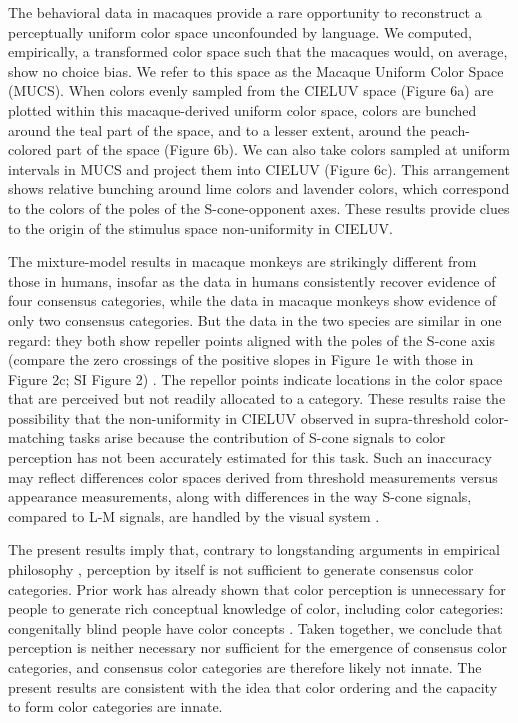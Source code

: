 The behavioral data in macaques provide a rare opportunity to reconstruct a perceptually uniform color space unconfounded by language. We computed, empirically, a transformed color space such that the macaques would, on average, show no choice bias. We refer to this space as the Macaque Uniform Color Space (MUCS). When colors evenly sampled from the CIELUV space (Figure 6a) are plotted within this macaque-derived uniform color space, colors are bunched around the teal part of the space, and to a lesser extent, around the peach-colored part of the space (Figure 6b). We can also take colors sampled at uniform intervals in MUCS and project them into CIELUV (Figure 6c). This arrangement shows relative bunching around lime colors and lavender colors, which correspond to the colors of the poles of the S-cone-opponent axes. These results provide clues to the origin of the stimulus space non-uniformity in CIELUV.

The mixture-model results in macaque monkeys are strikingly different from those in humans, insofar as the data in humans consistently recover evidence of four consensus categories, while the data in macaque monkeys show evidence of only two consensus categories. But the data in the two species are similar in one regard: they both show repeller points aligned with the poles of the S-cone axis (compare the zero crossings of the positive slopes in Figure 1e with those in Figure 2c; SI Figure 2) \citep{skelton_biological_2017,bae_why_2015,panichello_error-correcting_2019}. The repellor points indicate locations in the color space that are perceived but not readily allocated to a category. These results raise the possibility that the non-uniformity in CIELUV observed in supra-threshold color-matching tasks arise because the contribution of S-cone signals to color perception has not been accurately estimated for this task. Such an inaccuracy may reflect differences color spaces derived from threshold measurements versus appearance measurements, along with differences in the way S-cone signals, compared to L-M signals, are handled by the visual system \citep{RN655, conway_color_2014}. 

The present results imply that, contrary to longstanding arguments in empirical philosophy \citep{RN18743}, perception by itself is not sufficient to generate consensus color categories. Prior work has already shown that color perception is unnecessary for people to generate rich conceptual knowledge of color, including color categories: congenitally blind people have color concepts \citep{RN18700}. Taken together, we conclude that perception is neither necessary nor sufficient for the emergence of consensus color categories, and consensus color categories are therefore likely not innate. The present results are consistent with the idea that color ordering and the capacity to form color categories are innate. 

